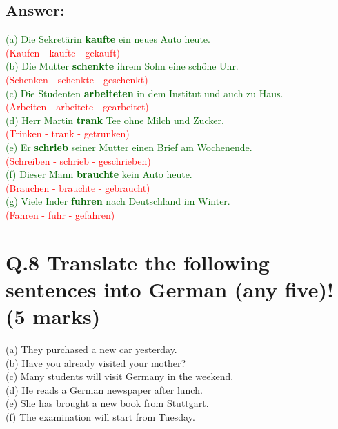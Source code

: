 \documentclass[a4paper,12pt]{article}
\begin{document}
\subsection*{Answer:}
\textcolor{darkgreen}{(a) Die Sekretärin \textbf{kaufte} ein neues Auto heute.\\} \textcolor{red}{(Kaufen - kaufte - gekauft)}\\
\textcolor{darkgreen}{(b) Die Mutter \textbf{schenkte} ihrem Sohn eine schöne Uhr.\\} \textcolor{red}{(Schenken - schenkte - geschenkt)}\\
\textcolor{darkgreen}{(c) Die Studenten \textbf{arbeiteten} in dem Institut und auch zu Haus.\\} \textcolor{red}{(Arbeiten - arbeitete - gearbeitet)}\\
\textcolor{darkgreen}{(d) Herr Martin \textbf{trank} Tee ohne Milch und Zucker.\\} \textcolor{red}{(Trinken - trank - getrunken)}\\
\textcolor{darkgreen}{(e) Er \textbf{schrieb} seiner Mutter einen Brief am Wochenende.\\} \textcolor{red}{(Schreiben - schrieb - geschrieben)}\\
\textcolor{darkgreen}{(f) Dieser Mann \textbf{brauchte} kein Auto heute.\\} \textcolor{red}{(Brauchen - brauchte - gebraucht)}\\
\textcolor{darkgreen}{(g) Viele Inder \textbf{fuhren} nach Deutschland im Winter.\\} \textcolor{red}{(Fahren - fuhr - gefahren)}\\

\vspace{1cm}

\section*{Q.8 Translate the following sentences into German (any five)! (5 marks)}

(a) They purchased a new car yesterday.\\
(b) Have you already visited your mother?\\
(c) Many students will visit Germany in the weekend.\\
(d) He reads a German newspaper after lunch.\\
(e) She has brought a new book from Stuttgart.\\
(f) The examination will start from Tuesday.
\end{document}
